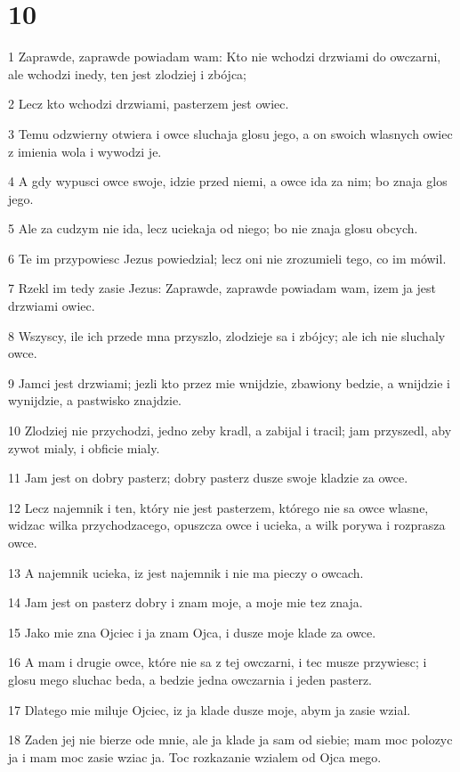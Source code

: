 \chapter{10}

\par 1 Zaprawde, zaprawde powiadam wam: Kto nie wchodzi drzwiami do owczarni, ale wchodzi inedy, ten jest zlodziej i zbójca;
\par 2 Lecz kto wchodzi drzwiami, pasterzem jest owiec.
\par 3 Temu odzwierny otwiera i owce sluchaja glosu jego, a on swoich wlasnych owiec z imienia wola i wywodzi je.
\par 4 A gdy wypusci owce swoje, idzie przed niemi, a owce ida za nim; bo znaja glos jego.
\par 5 Ale za cudzym nie ida, lecz uciekaja od niego; bo nie znaja glosu obcych.
\par 6 Te im przypowiesc Jezus powiedzial; lecz oni nie zrozumieli tego, co im mówil.
\par 7 Rzekl im tedy zasie Jezus: Zaprawde, zaprawde powiadam wam, izem ja jest drzwiami owiec.
\par 8 Wszyscy, ile ich przede mna przyszlo, zlodzieje sa i zbójcy; ale ich nie sluchaly owce.
\par 9 Jamci jest drzwiami; jezli kto przez mie wnijdzie, zbawiony bedzie, a wnijdzie i wynijdzie, a pastwisko znajdzie.
\par 10 Zlodziej nie przychodzi, jedno zeby kradl, a zabijal i tracil; jam przyszedl, aby zywot mialy, i obficie mialy.
\par 11 Jam jest on dobry pasterz; dobry pasterz dusze swoje kladzie za owce.
\par 12 Lecz najemnik i ten, który nie jest pasterzem, którego nie sa owce wlasne, widzac wilka przychodzacego, opuszcza owce i ucieka, a wilk porywa i rozprasza owce.
\par 13 A najemnik ucieka, iz jest najemnik i nie ma pieczy o owcach.
\par 14 Jam jest on pasterz dobry i znam moje, a moje mie tez znaja.
\par 15 Jako mie zna Ojciec i ja znam Ojca, i dusze moje klade za owce.
\par 16 A mam i drugie owce, które nie sa z tej owczarni, i tec musze przywiesc; i glosu mego sluchac beda, a bedzie jedna owczarnia i jeden pasterz.
\par 17 Dlatego mie miluje Ojciec, iz ja klade dusze moje, abym ja zasie wzial.
\par 18 Zaden jej nie bierze ode mnie, ale ja klade ja sam od siebie; mam moc polozyc ja i mam moc zasie wziac ja. Toc rozkazanie wzialem od Ojca mego.
